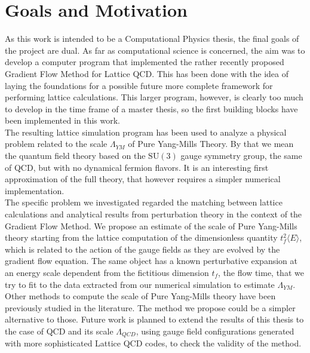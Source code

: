 \section{Goals and Motivation}
As this work is intended to be a Computational Physics thesis, the final goals of the project are dual. As far as computational science is concerned, the aim was to develop a computer program that implemented the rather recently proposed Gradient Flow Method \cite{luscher_properties_2010} for Lattice QCD. This has been done with the idea of laying the foundations for a possible future more complete framework for performing lattice calculations. This larger program, however, is clearly too much to develop in the time frame of a master thesis, so the first building blocks have been implemented in this work.\\
The resulting lattice simulation program has been used to analyze a physical problem related to the scale $\Lambda_{YM}$ of Pure Yang-Mills Theory. By that we mean the quantum field theory based on the $\mathrm{SU}(3)$ gauge symmetry group, the same of QCD, but with no dynamical fermion flavors. It is an interesting first approximation of the full theory, that however requires a simpler numerical implementation. \\
The specific problem we investigated regarded the matching between lattice calculations and analytical results from perturbation theory in the context of the Gradient Flow Method. We propose an estimate of the scale of Pure Yang-Mills theory starting from the lattice computation of the dimensionless quantity $t_f^2\langle E\rangle$, which is related to the action of the gauge fields as they are evolved by the gradient flow equation. The same object has a known perturbative expansion at an energy scale dependent from the fictitious dimension $t_f$, the flow time, that we try to fit to the data extracted from our numerical simulation to estimate $\Lambda_{YM}$. \\
Other methods to compute the scale of Pure Yang-Mills theory have been previously studied in the literature\cite{capitani_non-perturbative_1999,brida_determination_2016}. The method we propose could be a simpler alternative to those. Future work is planned to extend the results of this thesis to the case of QCD and its scale $\Lambda_{QCD}$, using gauge field configurations generated with more sophisticated Lattice QCD codes, to check the validity of the method.

